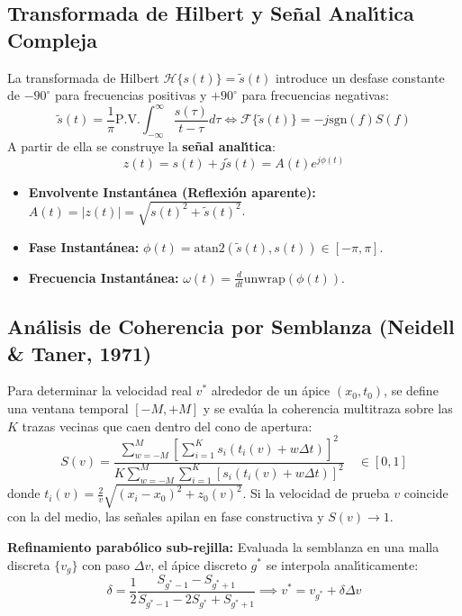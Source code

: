 \documentclass[11pt,a4paper]{article}
\begin{document}
\subsection{Transformada de Hilbert y Se{\~n}al Anal{\'\i}tica Compleja}
La transformada de Hilbert $\mathcal{H}\{s(t)\} = \tilde{s}(t)$ introduce un desfase constante de $-90^\circ$ para frecuencias positivas y $+90^\circ$ para frecuencias negativas:
\begin{equation}
    \tilde{s}(t) = \frac{1}{\pi} \text{P.V.} \int_{-\infty}^\infty \frac{s(\tau)}{t - \tau} d\tau \iff \mathcal{F}\{\tilde{s}(t)\} = -j \text{sgn}(f) S(f)
\end{equation}
A partir de ella se construye la \textbf{se{\~n}al anal{\'\i}tica}:
\begin{equation}
    z(t) = s(t) + j \tilde{s}(t) = A(t) e^{j \phi(t)}
\end{equation}
\begin{itemize}
    \item \textbf{Envolvente Instant{\'a}nea (Reflexi{\'o}n aparente):} $A(t) = |z(t)| = \sqrt{s(t)^2 + \tilde{s}(t)^2}$.
    \item \textbf{Fase Instant{\'a}nea:} $\phi(t) = \text{atan2}(\tilde{s}(t), s(t)) \in [-\pi, \pi]$.
    \item \textbf{Frecuencia Instant{\'a}nea:} $\omega(t) = \frac{d}{dt} \text{unwrap}(\phi(t))$.
\end{itemize}

\subsection{An{\'a}lisis de Coherencia por Semblanza (Neidell \& Taner, 1971)}
Para determinar la velocidad real $v^*$ alrededor de un {\'a}pice $(x_0, t_0)$, se define una ventana temporal $[-M, +M]$ y se eval{\'u}a la coherencia multitraza sobre las $K$ trazas vecinas que caen dentro del cono de apertura:
\begin{equation}
    S(v) = \frac{\sum_{w=-M}^{M} \left[ \sum_{i=1}^K s_i\left(t_i(v) + w \Delta t\right) \right]^2}{K \sum_{w=-M}^{M} \sum_{i=1}^K \left[ s_i\left(t_i(v) + w \Delta t\right) \right]^2} \quad \in [0, 1]
\end{equation}
donde $t_i(v) = \frac{2}{v} \sqrt{(x_i - x_0)^2 + z_0(v)^2}$. Si la velocidad de prueba $v$ coincide con la del medio, las se{\~n}ales apilan en fase constructiva y $S(v) \to 1$.

\textbf{Refinamiento parab{\'o}lico sub-rejilla:} Evaluada la semblanza en una malla discreta $\{v_g\}$ con paso $\Delta v$, el {\'a}pice discreto $g^*$ se interpola anal{\'\i}ticamente:
\begin{equation}
    \delta = \frac{1}{2} \frac{S_{g^*-1} - S_{g^*+1}}{S_{g^*-1} - 2 S_{g^*} + S_{g^*+1}} \implies v^* = v_{g^*} + \delta \Delta v
\end{equation}
\end{document}
